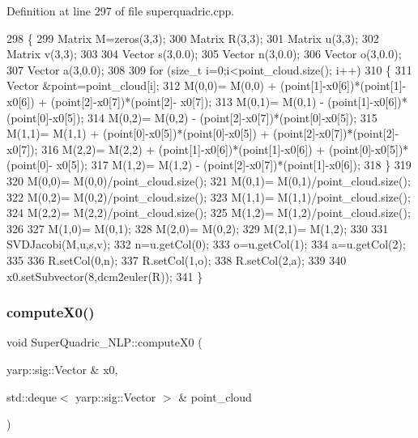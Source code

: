 Definition at line 297 of file superquadric.\+cpp.


\begin{DoxyCode}
298 \{
299     Matrix M=zeros(3,3);
300     Matrix R(3,3);
301     Matrix u(3,3);
302     Matrix v(3,3);
303 
304     Vector s(3,0.0);
305     Vector n(3,0.0);
306     Vector o(3,0.0);
307     Vector a(3,0.0);
308 
309     \textcolor{keywordflow}{for} (\textcolor{keywordtype}{size\_t} i=0;i<point\_cloud.size(); i++)
310     \{
311         Vector &point=point\_cloud[i];
312         M(0,0)= M(0,0) + (point[1]-x0[6])*(point[1]-x0[6]) + (point[2]-x0[7])*(point[2]-
      x0[7]);
313         M(0,1)= M(0,1) - (point[1]-x0[6])*(point[0]-x0[5]);
314         M(0,2)= M(0,2) - (point[2]-x0[7])*(point[0]-x0[5]);
315         M(1,1)= M(1,1) + (point[0]-x0[5])*(point[0]-x0[5]) + (point[2]-x0[7])*(point[2]-
      x0[7]);
316         M(2,2)= M(2,2) + (point[1]-x0[6])*(point[1]-x0[6]) + (point[0]-x0[5])*(point[0]-
      x0[5]);
317         M(1,2)= M(1,2) - (point[2]-x0[7])*(point[1]-x0[6]);
318     \}
319 
320     M(0,0)= M(0,0)/point\_cloud.size();
321     M(0,1)= M(0,1)/point\_cloud.size();
322     M(0,2)= M(0,2)/point\_cloud.size();
323     M(1,1)= M(1,1)/point\_cloud.size();
324     M(2,2)= M(2,2)/point\_cloud.size();
325     M(1,2)= M(1,2)/point\_cloud.size();
326 
327     M(1,0)= M(0,1);
328     M(2,0)= M(0,2);
329     M(2,1)= M(1,2);
330 
331     SVDJacobi(M,u,s,v);
332     n=u.getCol(0);
333     o=u.getCol(1);
334     a=u.getCol(2);
335 
336     R.setCol(0,n);
337     R.setCol(1,o);
338     R.setCol(2,a);
339 
340     x0.setSubvector(8,dcm2euler(R));
341 \}
\end{DoxyCode}
\mbox{\label{classSuperQuadric__NLP_a7395729e42b83d083b88451620ede9c6}} 
\subsubsection{\texorpdfstring{compute\+X0()}{computeX0()}}
{\footnotesize\ttfamily void Super\+Quadric\+\_\+\+N\+L\+P\+::compute\+X0 (\begin{DoxyParamCaption}\item[{yarp\+::sig\+::\+Vector \&}]{x0,  }\item[{std\+::deque$<$ yarp\+::sig\+::\+Vector $>$ \&}]{point\+\_\+cloud }\end{DoxyParamCaption})\hspace{0.3cm}{\ttfamily [protected]}}



